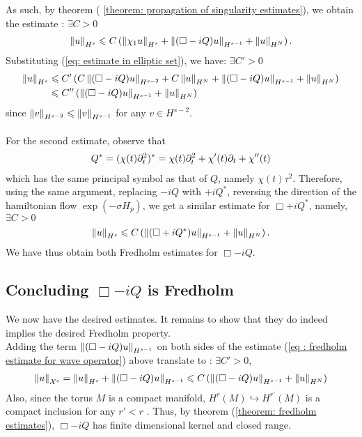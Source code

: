 \documentclass[12pt]{article}
\begin{document}
    
    As such, by theorem ( \ref{theorem: propagation of singularity estimates}), we obtain the estimate : $\exists C > 0$
    \begin{align*}
    \norm[u]_{H^s} \leq C \brac{\norm[\chi_1 u]_{H^s} +  \norm[(\Box - iQ) u]_{H^{s - 1}} + \norm[u]_{H^N} }. 
    \end{align*}
    Substituting (\ref{eq: estimate in elliptic set}), we have: $\exists C' > 0$
    \begin{align*}
    \norm[u]_{H^s} 
    & \leq C' \brac{C \norm[(\Box - iQ)u ]_{H^{s - 2}} + C \norm[u]_{H^N} +  \norm[(\Box - iQ) u]_{H^{s - 1}} + \norm[u]_{H^N} } \\
    & \leq C'' \brac{ \norm[(\Box - iQ) u]_{H^{s - 1}} + \norm[u]_{H^N} }
    \end{align*}
    since $\norm[v]_{H^{s - 2}} \leq \norm[v]_{H^{s - 1}}$ for any $v \in H^{s - 2}$. \\
    \\
    For the second estimate, observe that 
    \begin{align*}
    Q^* = (\chi(t) \p_t^2)^* = \chi(t) \p_t^2 + \chi'(t)\p_t + \chi''(t)
    \end{align*}
    which has the same principal symbol as that of $Q$, namely $\chi(t) \tau^2$. Therefore, using the same argument, replacing $-iQ$ with $+iQ^*$, reversing the direction of the hamiltonian flow $\exp(-\sigma H_p)$, we get a similar estimate for $\Box + i Q^*$, namely,  $\exists C > 0$
    \begin{align*}
    \norm[u]_{H^s} \leq C \brac{ \norm[(\Box + i Q^*)u]_{H^{s - 1}} + \norm[u]_{H^N}}. 
    \end{align*}
    We have thus obtain both Fredholm estimates for $\Box - iQ$. 

\subsection{Concluding $\Box - iQ$ is Fredholm}
    We now have the desired estimates. It remains to show that they do indeed implies the desired Fredholm property. \\
    
    Adding the term  $\norm[(\Box - iQ)u]_{H^{s-1}}$ on both sides of the estimate (\ref{eq : fredholm estimate for wave operator}) above translate to : $\exists C' > 0$, 
    \begin{align*}
    \norm[u]_{\mathcal{X}^s} = \norm[u]_{H^s} + \norm[(\Box - iQ)u]_{H^{s - 1}} \leq C \brac{ \norm[(\Box - i Q)u]_{H^{s - 1}} + \norm[u]_{H^N}}
    \end{align*}
    Also, since the torus $M$ is a compact manifold, $H^{r}(M) \hookrightarrow H^{r'}(M)$ is a compact inclusion for any $r' < r$ \cite{taylor_pde} . Thus, by theorem (\ref{theorem: fredholm estimates}), $\Box - iQ$ has finite dimensional kernel and closed range. \\
    
\end{document}
